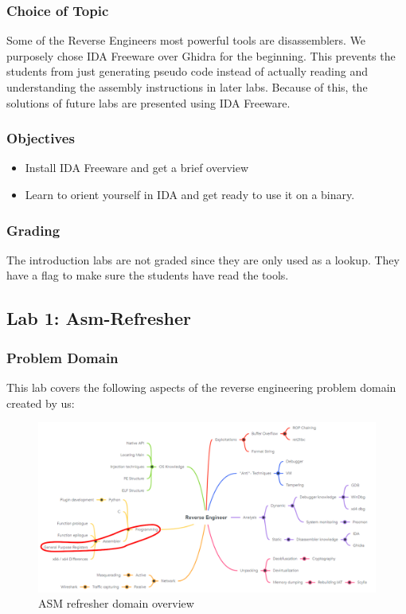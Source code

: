 \subsubsection*{Choice of Topic}
Some of the Reverse Engineers most powerful tools are disassemblers. We purposely chose IDA Freeware over Ghidra for the beginning. This prevents the students from just generating pseudo code instead of actually reading and understanding the assembly instructions in later labs. Because of this, the solutions of future labs are presented using IDA Freeware.
\subsubsection*{Objectives}
\begin{itemize}
    \item Install IDA Freeware and get a brief overview
    \item Learn to orient yourself in IDA and get ready to use it on a binary.
\end{itemize}
\subsubsection*{Grading}
The introduction labs are not graded since they are only used as a lookup. They have a flag to make sure the students have read the tools.
\pagebreak

\subsection{Lab 1: Asm-Refresher}
\subsubsection*{Problem Domain}
This lab covers the following aspects of the reverse engineering problem domain created by us:
\vspace{-2ex}
\begin{figure}[H]
    \includegraphics[width=\textwidth]{resources/ASM-overview-light.png}
    \caption{ASM refresher domain overview}
    \label{fig:refresher-overview}
\end{figure}
